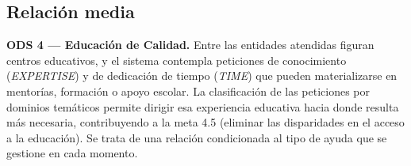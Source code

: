 \documentclass[11pt,oneside,spanish,listoffigures,listoftables]{tfgetsinf}
\begin{document}
\subsection{Relación media}

\textbf{ODS 4 — Educación de Calidad.} Entre las entidades atendidas figuran centros educativos, y el sistema contempla peticiones de conocimiento (\textit{EXPERTISE}) y de dedicación de tiempo (\textit{TIME}) que pueden materializarse en mentorías, formación o apoyo escolar. La clasificación de las peticiones por dominios temáticos permite dirigir esa experiencia educativa hacia donde resulta más necesaria, contribuyendo a la meta 4.5 (eliminar las disparidades en el acceso a la educación). Se trata de una relación condicionada al tipo de ayuda que se gestione en cada momento.

\end{document}
